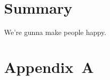 \documentclass[12pt,a4paper]{article}
\begin{document}
\section{Summary}






We're gunna make people happy.











\section*{Appendix~A}



















\end{document}
